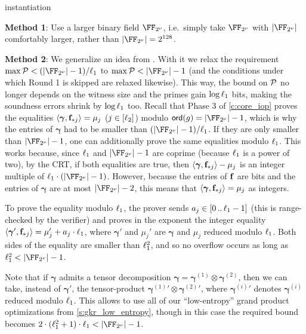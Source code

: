 \begin{lncsappendix}{instantiation}
\begin{remark}
    \medskip 
    
    \noindent \textbf{Method 1}: Use a larger binary field $\comfield$, i.e.\ simply take $\comfield$ with $|\comfield|$ comfortably larger, rather than $|\comfield|=2^{128}$.
 
 \medskip
 
 \noindent \textbf{Method 2}: We generalize an idea from \cite{binius64}. With it we relax the requirement $\max\cP< \fieldboundsizeexponent$ to $\max\cP<|\comfield|-1$ (and the conditions under which Round 1 is skipped are relaxed likewise). This way, the bound on $\mathcal{P}$ no longer depends on the witness size and the primes gain $\log \ell_1$ bits, making the soundness errors shrink by $\log \ell_1$ too. Recall that Phase 3 of \cref{c:core_iop} proves the equalities $\langle \bm{\gamma}, \mathbf{f}_{*j}\rangle =\mu_j$ ($j\in [\ell_2]$) modulo $\mathsf{ord}(g)=|\comfield|-1$, which is why the entries of $\bm{\gamma}$ had to be smaller than $(|\comfield|-1)/\codedim_1$. If they are only smaller than $|\comfield|-1$, one can additionally prove the same equalities modulo $\ell_1$. This works because, since $\ell_1$ and $|\comfield|-1$ are coprime (because $\ell_1$ is a power of two), by the CRT, if both equalities are true, then  $\langle\bm{\gamma}, \mathbf{f}_{*j}\rangle -\mu_j$ is an integer multiple of $\codedim_1\cdot (|\comfield|-1)$. However, because the entries of $\mathbf{f}$ are bits and the entries of $\bm{\gamma}$ are at most $|\comfield|-2$, this means that   $\langle \bm{\gamma}, \mathbf{f}_{*j}\rangle = \mu_j$ as integers.
 
 To prove the equality modulo $\ell_1$, the prover sends $a_j\in [0 \, .. \, \ell_1-1]$ (this is range-checked by the verifier) and proves in the exponent the integer equality $\langle \bm{\gamma}', \mathbf{f}_{*j}\rangle = \mu_j'  +  a_j\cdot \ell_1$, where $\bm{\gamma}'$ and $\mu_j'$ are $\bm{\gamma}$ and $\mu_j$ reduced modulo $\ell_1$.  Both sides of the equality are smaller than $\ell_1^2$, and so no overflow occurs as long as $\codedim_1^2 < |\comfield|-1$. 

  Note that if $\bm{\gamma}$ admits a tensor decomposition   $\bm{\gamma}=\bm{\gamma}^{(1)} \otimes \bm{\gamma}^{(2)}$, then we can take, instead of $\bm{\gamma}'$, the tensor-product $\bm{\gamma}^{(1)}{}' \otimes \bm{\gamma}^{(2)}{}'$, where  $\bm{\gamma}^{(i)}{}'$ denotes $\bm{\gamma}^{(i)}$ reduced modulo $\ell_1$. This allows to use all of our ``low-entropy'' grand product optimizations from \cref{s:gkr_low_entropy}, though in this case the required bound becomes $2\cdot (\codedim_1^2+1)\cdot \codedim_1 < |\comfield|-1$.
  

\end{remark}
\end{lncsappendix}
